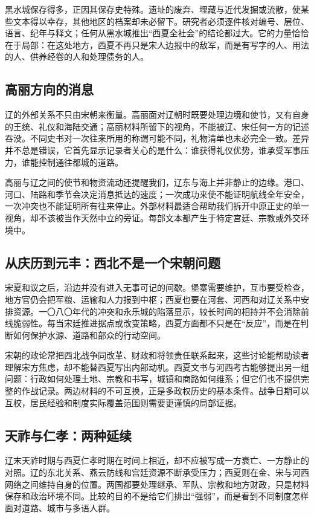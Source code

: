 黑水城保存得多，正因其保存史特殊。遗址的废弃、埋藏与近代发掘或流散，使某些文本得以幸存，其他地区的档案却未必留下。研究者必须逐件核对编号、层位、语言、纪年与释文；任何从黑水城推出“西夏全社会”的结论都过大。它的力量恰恰在于局部：在这处地方，西夏不再只是宋人边报中的敌军，而是有写字的人、用法的人、供养经卷的人和处理债务的人。

\subsection{高丽方向的消息}

辽的外部关系不只由宋朝来衡量。高丽面对辽朝时既要处理边境和使节，又有自身的王统、礼仪和海陆交通；高丽材料所留下的视角，不能被辽、宋任何一方的记述吞没。不同史书对一次往来所用的称谓可能不同，礼物清单也未必完全一致。差异并不总是错误，它首先显示记录者关心的是什么：谁获得礼仪优势，谁承受军事压力，谁能控制通往都城的道路。

高丽与辽之间的使节和物资流动还提醒我们，辽东与海上并非静止的边缘。港口、河口、陆路和季节会决定消息抵达的速度；一次成功来使不能证明航线全年安全，一次冲突也不能证明所有往来停止。外部材料最适合帮助我们拆开中原正史的单一视角，却不该被当作天然中立的旁证。每部文本都产生于特定宫廷、宗教或外交环境中。

\subsection{从庆历到元丰：西北不是一个宋朝问题}

宋夏和议之后，沿边并没有进入无事可记的间歇。堡寨需要维护，互市要受检查，地方官仍会把军粮、运输和人力报到中枢；西夏也要在河套、河西和对辽关系中安排资源。一〇八〇年代的冲突和永乐城的陷落显示，较长时间的相持并不会消除前线脆弱性。每当宋廷推进据点或改变策略，西夏方面都不只是在“反应”，而是在判断如何保护水源、道路和部众的行动空间。

宋朝的政论常把西北战争同改革、财政和将领责任联系起来，这些讨论能帮助读者理解宋方焦虑，却不能替西夏写出内部动机。西夏文书与河西考古能够提出另一组问题：行政如何处理土地、宗教和书写，城镇和商路如何维系；但它们也不提供完整的作战记录。两边材料的不可互换，正是多政权历史的基本条件。战争日期可以互校，居民经验和制度实际覆盖范围则需要更谨慎的局部证据。

\subsection{天祚与仁孝：两种延续}

辽末天祚时期与西夏仁孝时期在时间上相近，却不应被写成一方衰亡、一方静止的对照。辽的东北关系、燕云防线和宫廷资源不断承受压力；西夏则在金、宋与河西网络之间维持自身的位置。两国都要处理继承、军队、宗教和地方财政，只是材料保存和政治环境不同。比较的目的不是给它们排出“强弱”，而是看到不同制度怎样面对道路、城市与多语人群。

